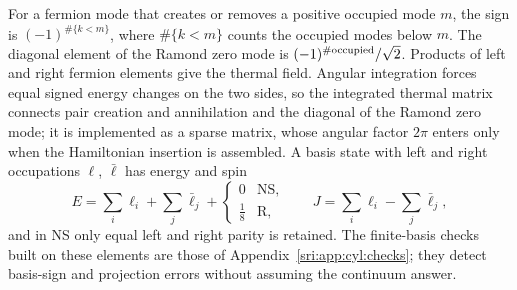 For a fermion mode that creates or removes a positive occupied mode $m$, the sign is $(-1)^{\#\{k<m\}}$, where
$\#\{k<m\}$ counts the occupied modes below $m$. The diagonal element of the Ramond zero mode is $(-1)^{\#{\rm occupied}}/\sqrt2$. Products of left
and right fermion elements give the thermal field. Angular integration forces equal signed energy changes on the two
sides, so the integrated thermal matrix connects pair creation and annihilation and the diagonal of the Ramond zero
mode; it is implemented as a sparse matrix, whose angular factor $2\pi$ enters only when the Hamiltonian insertion is
assembled. A basis state with left and right occupations $\boldsymbol\ell$, $\bar{\boldsymbol\ell}$ has energy and spin
\begin{equation}
 E=\sum_i\ell_i+\sum_j\bar\ell_j+\begin{cases}0&\text{NS},\\ \frac18&\text{R},\end{cases}\qquad
 J=\sum_i\ell_i-\sum_j\bar\ell_j,
\end{equation}
and in NS only equal left and right parity is retained. The finite-basis checks built on these elements are those of
Appendix~\ref{sri:app:cyl:checks}; they detect basis-sign and projection errors without assuming the continuum answer.

